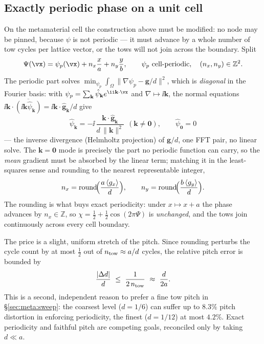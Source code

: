 \documentclass[11pt]{article}
\begin{document}
\subsection{Exactly periodic phase on a unit cell}
\label{app:perphase}
On the metamaterial cell the construction above must be modified: no node may be
pinned, because $\psi$ is not periodic --- it must advance by a whole number of tow
cycles per lattice vector, or the tows will not join across the boundary. Split
\begin{equation}
  \Psi(\vx)=\psi_p(\vx)+n_x\frac{x}{a}+n_y\frac{y}{b},
  \qquad \psi_p\ \text{cell-periodic},\quad (n_x,n_y)\in\mathbb Z^2 .
  \label{eq:psisplit}
\end{equation}
The periodic part solves $\min_{\psi_p}\int_\Omega\lVert\nabla\psi_p-\mathbf
g/d\rVert^2$, which is \emph{diagonal} in the Fourier basis: with
$\psi_p=\sum_{\mathbf k}\hat\psi_{\mathbf k}e^{\ii\mathbf k\cdot\vx}$ and
$\nabla\mapsto\ii\mathbf k$, the normal equations
$\ii\mathbf k\cdot\overline{(\ii\mathbf k\hat\psi_{\mathbf k})}=
\ii\mathbf k\cdot\hat{\mathbf g}_{\mathbf k}/d$ give
\begin{equation}
  \boxed{\ \hat\psi_{\mathbf k}
  =-\ii\,\frac{\mathbf k\cdot\hat{\mathbf g}_{\mathbf k}}{d\,\lVert\mathbf k\rVert^2}
  \ \ (\mathbf k\neq\mathbf 0),\qquad \hat\psi_{\mathbf 0}=0\ }
  \label{eq:fftphase}
\end{equation}
--- the inverse divergence (Helmholtz projection) of $\mathbf g/d$, one FFT pair,
no linear solve. The $\mathbf k=\mathbf 0$ mode is precisely the part no periodic
function can carry, so the \emph{mean} gradient must be absorbed by the linear
term; matching it in the least-squares sense and rounding to the nearest
representable integer,
\begin{equation}
  n_x=\operatorname{round}\!\Bigl(\frac{a\,\langle g_x\rangle}{d}\Bigr),\qquad
  n_y=\operatorname{round}\!\Bigl(\frac{b\,\langle g_y\rangle}{d}\Bigr).
  \label{eq:towcount}
\end{equation}
The rounding is what buys exact periodicity: under $x\mapsto x+a$ the phase
advances by $n_x\in\mathbb Z$, so $\chi=\tfrac12+\tfrac12\cos(2\pi\Psi)$ is
\emph{unchanged}, and the tows join continuously across every cell boundary.

The price is a slight, uniform stretch of the pitch. Since rounding perturbs the
cycle count by at most $\tfrac12$ out of $n_{\rm tow}\approx a/d$ cycles, the
relative pitch error is bounded by
\begin{equation}
  \frac{|\Delta d|}{d}\ \le\ \frac{1}{2\,n_{\rm tow}}\ \approx\ \frac{d}{2a}.
  \label{eq:pitcherr}
\end{equation}
This is a second, independent reason to prefer a fine tow pitch in
\S\ref{sec:meta:sweep}: the coarsest level ($d=1/6$) can suffer up to $8.3\%$
pitch distortion in enforcing periodicity, the finest ($d=1/12$) at most $4.2\%$.
Exact periodicity and faithful pitch are competing goals, reconciled only by
taking $d\ll a$.
\end{document}
